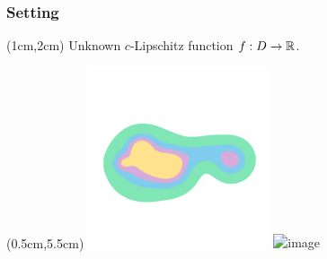 
\begin{frame}
  \frametitle{Setting}

  \begin{textblock*}{11cm}(1cm,2cm)
    Unknown $c$-Lipschitz function $f : D\to \mathbb{R}$.\vspace{1ex}

  \end{textblock*}

  \begin{textblock*}{12cm}(0.5cm,5.5cm)
    \includegraphics[trim=100 500 100 700, clip, width=0.4\textwidth]{figures/rips_dense2_2/surf}\hspace{6ex}%
    \includegraphics<2>[trim=100 500 100 700, clip, width=0.4\textwidth]{figures/rips_dense2_2/Bonly}
  \end{textblock*}

\end{frame}

